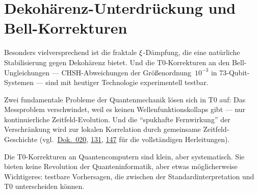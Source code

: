 \section{Dekohärenz-Unterdrückung und Bell-Korrekturen}

Besonders vielversprechend ist die fraktale $\xi$-Dämpfung, die eine natürliche Stabilisierung gegen Dekohärenz bietet. Und die T0-Korrekturen an den Bell-Ungleichungen --- CHSH-Abweichungen der Größenordnung~$10^{-3}$ in 73-Qubit-Systemen --- sind mit heutiger Technologie experimentell testbar.

Zwei fundamentale Probleme der Quantenmechanik lösen sich in T0 auf: Das Messproblem verschwindet, weil es keinen Wellenfunktionskollaps gibt --- nur kontinuierliche Zeitfeld-Evolution. Und die \enquote{spukhafte Fernwirkung} der Verschränkung wird zur lokalen Korrelation durch gemeinsame Zeitfeld-Geschichte (vgl.\ \href{https://github.com/jpascher/T0-Time-Mass-Duality/blob/main/2/pdf/020_T0_QM-QFT-RT_De.pdf}{Dok.~020}, \href{https://github.com/jpascher/T0-Time-Mass-Duality/blob/main/2/pdf/131_scheinbar_instantan_De.pdf}{131}, \href{https://github.com/jpascher/T0-Time-Mass-Duality/blob/main/2/pdf/147_quantum_computing_De.pdf}{147} für die vollständigen Herleitungen).

\begin{kerngedanke}
Die T0-Korrekturen an Quantencomputern sind klein, aber systematisch. Sie bieten keine Revolution der Quanteninformatik, aber etwas möglicherweise Wichtigeres: testbare Vorhersagen, die zwischen der Standardinterpretation und T0 unterscheiden können.
\end{kerngedanke}

